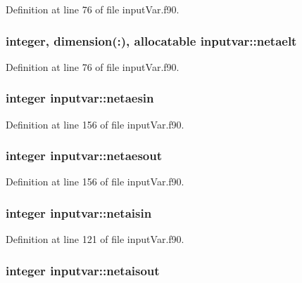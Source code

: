Definition at line 76 of file input\-Var.\-f90.

\hypertarget{classinputvar_a2bfcb389a7fba156b8c1146150a71f51}{
\subsubsection[{netaelt}]{\setlength{\rightskip}{0pt plus 5cm}integer, dimension(\-:), allocatable inputvar\-::netaelt}}\label{classinputvar_a2bfcb389a7fba156b8c1146150a71f51}


Definition at line 76 of file input\-Var.\-f90.

\hypertarget{classinputvar_a5ded7ede4ce21d0a98a8055d9af0d827}{
\subsubsection[{netaesin}]{\setlength{\rightskip}{0pt plus 5cm}integer inputvar\-::netaesin}}\label{classinputvar_a5ded7ede4ce21d0a98a8055d9af0d827}


Definition at line 156 of file input\-Var.\-f90.

\hypertarget{classinputvar_ae8e6041b9d65c592b4ac141f652ca7e0}{
\subsubsection[{netaesout}]{\setlength{\rightskip}{0pt plus 5cm}integer inputvar\-::netaesout}}\label{classinputvar_ae8e6041b9d65c592b4ac141f652ca7e0}


Definition at line 156 of file input\-Var.\-f90.

\hypertarget{classinputvar_a63a512514b3a4b5201f10f361e8f4fd6}{
\subsubsection[{netaisin}]{\setlength{\rightskip}{0pt plus 5cm}integer inputvar\-::netaisin}}\label{classinputvar_a63a512514b3a4b5201f10f361e8f4fd6}


Definition at line 121 of file input\-Var.\-f90.

\hypertarget{classinputvar_a086fbbc0efe6f9f755aa90487c13c346}{
\subsubsection[{netaisout}]{\setlength{\rightskip}{0pt plus 5cm}integer inputvar\-::netaisout}}\label{classinputvar_a086fbbc0efe6f9f755aa90487c13c346}


